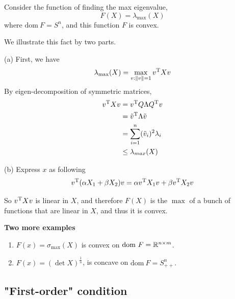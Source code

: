 \vspace{0.5cm}
\begin{example}
Consider the function of finding the max eigenvalue,
$$F(X) = \lambda_{\max}(X)$$
where $\text{dom}\ F = S^n$, and this function $F$ is convex.

We illustrate this fact by two parts.

(a) First, we have
$$\lambda_{\max}(X) = \max_{v:\Vert v\Vert = 1}v^{{\rm T}}Xv$$
By eigen-decomposition of symmetric matrices,
\begin{align*}
v^{{\rm T}}Xv 
&= v^{{\rm T}}Q\Lambda Q^{{\rm T}}v \\
&= \tilde{v}^{{\rm T}}\Lambda \tilde{v}\\
&= \sum^n_{i=1}(\tilde{v}_i)^2\lambda_i \\
&\leq \lambda_{max}(X)
\end{align*}

(b) Express $x$ as following
\begin{equation*}
v^{{\rm T}}(\alpha X_1 + \beta X_2)v = \alpha v^{{\rm T}}X_1v + \beta v^{{\rm T}}X_2v
\end{equation*}

So $v^{{\rm T}}Xv$ is linear in $X$, and therefore $F(X)$ is the $\max$ of a bunch of functions that are linear in $X$, and thus it is convex.
\end{example}

\vspace{0.3cm}
\noindent\textbf{Two more examples}
\begin{enumerate}
	\item $F(x) = \sigma_{\max} (X)$ is convex on $\text{dom}\ F =\mathbb{R}^{n\times m}$.
	
	\item $F(x) = (\det X)^{\frac{1}{n}}$, is concave on $\text{dom}\ F = S^n_{++}.$
\end{enumerate}

\vspace{0.5cm}
\subsection{"First-order" condition}

